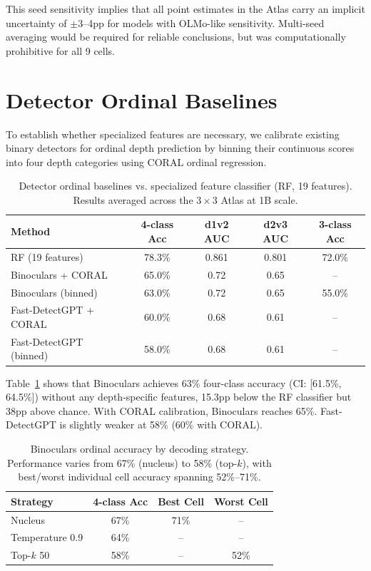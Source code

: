 \documentclass[11pt,a4paper]{article}
\begin{document}
This seed sensitivity implies that all point estimates in the Atlas carry an implicit uncertainty of $\pm$3--4pp for models with OLMo-like sensitivity. Multi-seed averaging would be required for reliable conclusions, but was computationally prohibitive for all 9 cells.

\section{Detector Ordinal Baselines}

To establish whether specialized features are necessary, we calibrate existing binary detectors for ordinal depth prediction by binning their continuous scores into four depth categories using CORAL ordinal regression.

\begin{table}[t]
\centering
\caption{Detector ordinal baselines vs. specialized feature classifier (RF, 19 features). Results averaged across the $3 \times 3$ Atlas at 1B scale.}
\label{tab:baselines}
\small
\begin{tabular}{lcccc}
\toprule
\textbf{Method} & \textbf{4-class Acc} & \textbf{d1v2 AUC} & \textbf{d2v3 AUC} & \textbf{3-class Acc} \\
\midrule
RF (19 features) & 78.3\% & 0.861 & 0.801 & 72.0\% \\
Binoculars + CORAL & 65.0\% & 0.72 & 0.65 & -- \\
Binoculars (binned) & 63.0\% & 0.72 & 0.65 & 55.0\% \\
Fast-DetectGPT + CORAL & 60.0\% & 0.68 & 0.61 & -- \\
Fast-DetectGPT (binned) & 58.0\% & 0.68 & 0.61 & -- \\
\bottomrule
\end{tabular}
\end{table}

Table~\ref{tab:baselines} shows that Binoculars achieves 63\% four-class accuracy (CI: [61.5\%, 64.5\%]) without any depth-specific features, 15.3pp below the RF classifier but 38pp above chance. With CORAL calibration, Binoculars reaches 65\%. Fast-DetectGPT is slightly weaker at 58\% (60\% with CORAL).

\begin{table}[t]
\centering
\caption{Binoculars ordinal accuracy by decoding strategy. Performance varies from 67\% (nucleus) to 58\% (top-$k$), with best/worst individual cell accuracy spanning 52\%--71\%.}
\label{tab:bino_strategy}
\small
\begin{tabular}{lccc}
\toprule
\textbf{Strategy} & \textbf{4-class Acc} & \textbf{Best Cell} & \textbf{Worst Cell} \\
\midrule
Nucleus & 67\% & 71\% & -- \\
Temperature 0.9 & 64\% & -- & -- \\
Top-$k$ 50 & 58\% & -- & 52\% \\
\bottomrule
\end{tabular}
\end{table}
\end{document}
